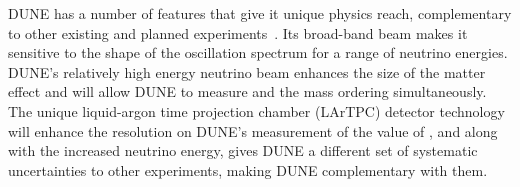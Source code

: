 DUNE has a number of features that give it unique physics reach, complementary to other existing and planned experiments~\cite{Ayres:2007tu,Abe:2011ks,Abe:2018uyc}. Its broad-band beam makes it sensitive to the shape of the oscillation spectrum for a range of neutrino energies. DUNE's relatively high energy neutrino beam enhances the size of the matter effect and will allow DUNE to measure \deltacp and the mass ordering simultaneously. The unique liquid-argon time projection chamber (LArTPC) detector technology will enhance the resolution on DUNE's measurement of the value of \deltacp, and along with the increased neutrino energy, gives DUNE a different set of systematic uncertainties to other experiments, making DUNE complementary with them.

